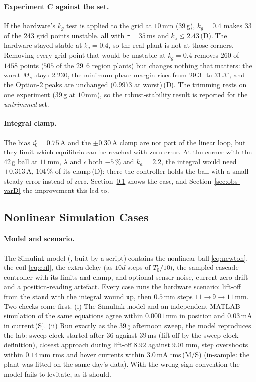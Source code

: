 \documentclass[11pt,a4paper]{article}
\newcommand{\code}[1]{\texttt{\detokenize{#1}}}
\newcommand{\st}[1]{\,\textup{(#1)}}
\begin{document}
\paragraph{Experiment C against the set.} If the hardware's $k_g$ test is applied to the grid at $10$\,mm (39\,g), $k_g = 0.4$
makes 33 of the 243 grid points unstable, all with $\tau = 35$\,ms and $k_a \le 2.43$\st{D}. The hardware stayed stable at
$k_g = 0.4$, so the real plant is not at those corners. Removing every grid point that would be unstable at $k_g = 0.4$
removes $260$ of $1458$ points ($505$ of the $2916$ region plants) but changes nothing that matters: the worst $M_s$ stays
$2.230$, the minimum phase margin rises from $29.3^\circ$ to $31.3^\circ$, and the Option-2 peaks are unchanged ($0.9973$ at
worst)\st{D}. The trimming rests on one experiment (39\,g at $10$\,mm), so the robust-stability result is reported for the
\emph{untrimmed} set.

\paragraph{Integral clamp.} The bias $i_0^c = 0.75$\,A and the $\pm0.30$\,A clamp are not part of the linear loop, but
they limit which equilibria can be reached with zero error. At the corner with the 42\,g ball at $11$\,mm, $\lambda$ and $c$
both $-5\,\%$ and $k_a = 2.2$, the integral would need $+0.313$\,A, $104\,\%$ of its clamp\st{D}: there the controller
holds the ball with a small steady error instead of zero. Section~\ref{sec:obs-cases} shows the case, and
Section~\ref{sec:obs-varD} the improvement this led to.

\subsection{Nonlinear Simulation Cases}
\label{sec:obs-cases}
\paragraph{Model and scenario.} The Simulink model (\code{maglev_cl_sim}, built by a script) contains the nonlinear ball
\eqref{eq:newton}, the coil \eqref{eq:coil}, the extra delay (as $10d$ steps of $T_0/10$), the sampled cascade controller
with its limits and clamp, and optional sensor noise, current-zero drift and a position-reading artefact. Every case runs the
hardware scenario: lift-off from the stand with the integral wound up, then $0.5$\,mm steps $11 \to 9 \to 11$\,mm. Two checks
come first. (i) The Simulink model and an independent MATLAB simulation of the same equations agree within $0.0001$\,mm in
position and $0.03$\,mA in current\st{S}. (ii) Run exactly as the 39\,g afternoon sweep, the model reproduces the lab: sweep
clock started after $36$ against $39$\,ms (lift-off by the sweep-clock definition), closest approach during lift-off $8.92$
against $9.01$\,mm, step overshoots within $0.14$\,mm rms and hover currents within $3.0$\,mA rms\st{M/S} (in-sample: the
plant was fitted on the same day's data). With the wrong sign convention the model fails to levitate, as it should.
\end{document}
